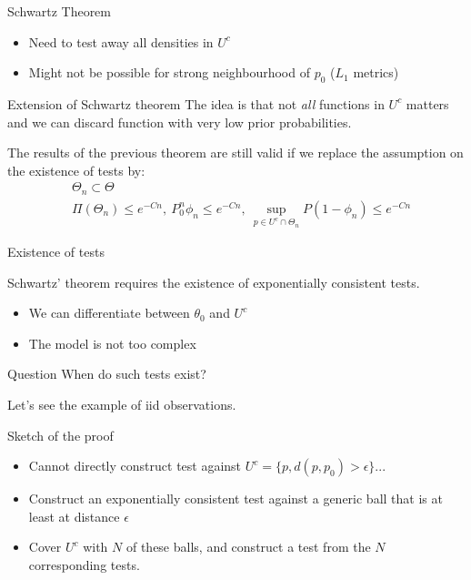 \begin{frame}{Schwartz Theorem}
\begin{itemize}
\item Need to test away all densities in $U^c$
\item Might not be possible for strong neighbourhood of $p_0$ ($L_1$ metrics)
\end{itemize}
\pause 
\begin{block}{Extension of Schwartz theorem}
The idea is that not \emph{all} functions in $U^c$ matters and we can discard function with very low prior probabilities. 
\end{block}
\pause 
\begin{theorem}
The results of the previous theorem are still valid if we replace the assumption on the existence of tests by: 
\begin{align*}
&\Theta_n \subset \Theta \\ 
&\Pi(\Theta_n) \leq e^{-Cn}, ~ P_0^n \phi_n \leq e^{-Cn}, ~ \sup_{p \in U^c \cap \Theta_n} P(1-\phi_n) \leq e^{-Cn} 
\end{align*}
\end{theorem}
\end{frame}


\begin{frame}{Existence of tests}

Schwartz' theorem requires the existence of exponentially consistent tests.
\begin{itemize}[<+->]
\item We can differentiate between $\theta_0$ and $U^c$
\item The model is not too complex 
\end{itemize}
\pause 
\begin{block}{Question}
When do such tests exist? 
\end{block}

Let's see the example of iid observations. 
\end{frame}


\begin{frame}{Sketch of the proof}

\begin{itemize}[<+-|alert@+>]
\item Cannot directly construct test against $U^c = \{p, d(p,p_0) > \epsilon \}$... 
\item Construct an exponentially consistent test against a generic ball that is at least at distance $\epsilon$
\item Cover $U^c$ with $N$ of these balls, and construct a test from the $N$ corresponding tests.
\end{itemize}

\end{frame}


